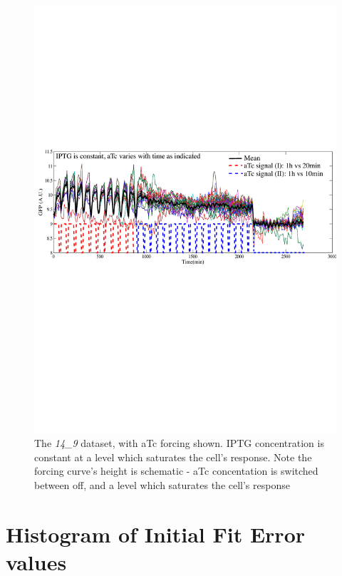 \documentclass[10pt,journal]{./IEEE_latex_class/IEEEtran}
\begin{document}
\begin{figure}[h]
\centering
\includegraphics[trim = 0 330 0 270 , scale = 0.5, clip = true]{14_9}
\caption{The \textit{14\_9} dataset, with aTc forcing shown. IPTG concentration is constant at a level which saturates the cell's response. Note the forcing curve's height is schematic - aTc concentation is switched between off, and a level which saturates the cell's response}
\label{reactionscheme}
\end{figure}


\section{Histogram of Initial Fit Error values}
\label{Initial fit Error}
\setcounter{figure}{0}    
\end{document}
